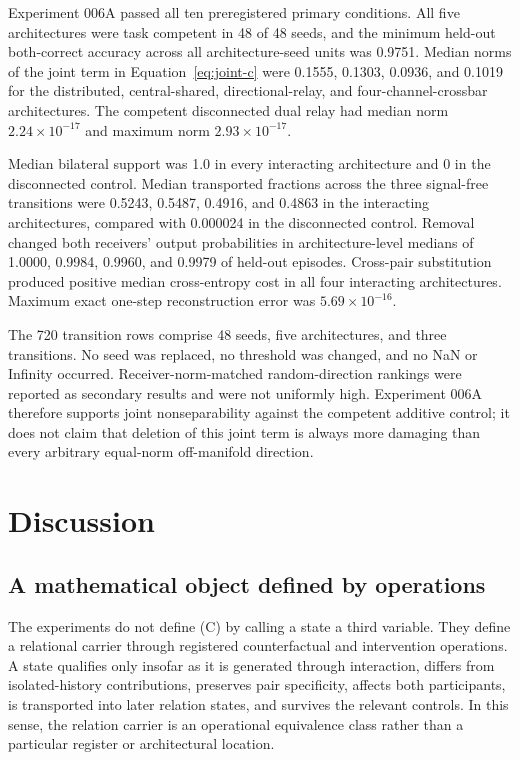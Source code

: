 \documentclass[11pt,a4paper]{article}
\begin{document}
Experiment 006A passed all ten preregistered primary conditions. All five architectures were task competent in 48 of 48 seeds, and the minimum held-out both-correct accuracy across all architecture-seed units was 0.9751. Median norms of the joint term in Equation~\eqref{eq:joint-c} were 0.1555, 0.1303, 0.0936, and 0.1019 for the distributed, central-shared, directional-relay, and four-channel-crossbar architectures. The competent disconnected dual relay had median norm $2.24\times10^{-17}$ and maximum norm $2.93\times10^{-17}$.

Median bilateral support was 1.0 in every interacting architecture and 0 in the disconnected control. Median transported fractions across the three signal-free transitions were 0.5243, 0.5487, 0.4916, and 0.4863 in the interacting architectures, compared with 0.000024 in the disconnected control. Removal changed both receivers' output probabilities in architecture-level medians of 1.0000, 0.9984, 0.9960, and 0.9979 of held-out episodes. Cross-pair substitution produced positive median cross-entropy cost in all four interacting architectures. Maximum exact one-step reconstruction error was $5.69\times10^{-16}$.

The 720 transition rows comprise 48 seeds, five architectures, and three transitions. No seed was replaced, no threshold was changed, and no NaN or Infinity occurred. Receiver-norm-matched random-direction rankings were reported as secondary results and were not uniformly high. Experiment 006A therefore supports joint nonseparability against the competent additive control; it does not claim that deletion of this joint term is always more damaging than every arbitrary equal-norm off-manifold direction.

\section{Discussion}

\subsection{A mathematical object defined by operations}

The experiments do not define (C) by calling a state a third variable. They define a relational carrier through registered counterfactual and intervention operations. A state qualifies only insofar as it is generated through interaction, differs from isolated-history contributions, preserves pair specificity, affects both participants, is transported into later relation states, and survives the relevant controls. In this sense, the relation carrier is an operational equivalence class rather than a particular register or architectural location.
\end{document}
